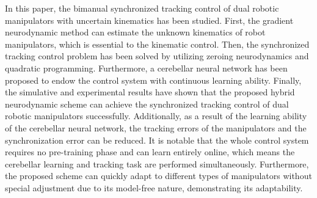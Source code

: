 \documentclass[journal,twoside,web]{ieeecolor}
\begin{document}
In this paper, the bimanual synchronized tracking control of dual robotic manipulators with uncertain kinematics has been studied. First, the gradient neurodynamic method can estimate the unknown kinematics of robot manipulators, which is essential to the kinematic control. Then, the synchronized tracking control problem has been solved by utilizing zeroing neurodynamics and quadratic programming. Furthermore, a cerebellar neural network has been proposed to endow the control system with continuous learning ability. Finally, the simulative and experimental results have shown that the proposed hybrid neurodynamic scheme can achieve the synchronized tracking control of dual robotic manipulators successfully. Additionally, as a result of the learning ability of the cerebellar neural network, the tracking errors of the manipulators and the synchronization error can be reduced. It is notable that the whole control system requires no pre-training phase and can learn entirely online, which means the cerebellar learning and tracking task are performed simultaneously. Furthermore, the proposed scheme can quickly adapt to different types of manipulators without special adjustment due to its model-free nature, demonstrating its adaptability.



\end{document}
